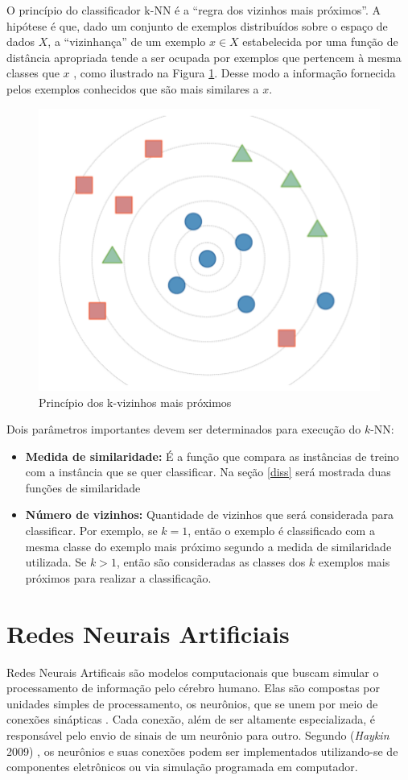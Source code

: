 O princípio do classificador k-NN é a ``regra dos vizinhos mais próximos''. A hipótese é que, dado um conjunto de exemplos distribuídos sobre o espaço de dados $X$, a ``vizinhança'' de um exemplo $x \in X$ estabelecida por uma função de distância apropriada tende a ser ocupada por exemplos que pertencem à mesma classes que $x$ \cite{hart1967} , como ilustrado na Figura \ref{fig-knn}. Desse modo a informação fornecida pelos exemplos conhecidos que são mais similares a $x$.

\begin{figure}[H]
	\centering
	\includegraphics[scale=0.5]{pasta1_figuras/knn.png}
	\caption{Princípio dos k-vizinhos mais próximos}
	\label{fig-knn}
\end{figure}

Dois parâmetros importantes devem ser determinados para execução do $k$-NN:
\begin{itemize}
	\item \textbf{Medida de similaridade: } É a função que compara as instâncias de treino com a instância que se quer classificar. Na seção \ref{diss} será mostrada duas funções de similaridade
	\item \textbf{Número de vizinhos: } Quantidade de vizinhos que será considerada para classificar. Por exemplo, se $k=1$, então o exemplo é classificado com a mesma classe do exemplo mais próximo segundo a medida de similaridade utilizada. Se $k>1$, então são consideradas as classes dos $k$ exemplos mais próximos para realizar a classificação.
\end{itemize}


\section{Redes Neurais Artificiais}
Redes Neurais Artificais são modelos computacionais que buscam simular o processamento de informação pelo cérebro humano. Elas são compostas por unidades simples de processamento, os neurônios, que se unem por meio de conexões sinápticas \cite{zhang1998}. Cada conexão, além de ser altamente especializada, é responsável pelo envio de sinais de um neurônio para outro. Segundo (\textit{Haykin} 2009\cite{haykin2009}) , os neurônios e suas conexões podem ser implementados utilizando-se de componentes eletrônicos ou via simulação programada em computador.

